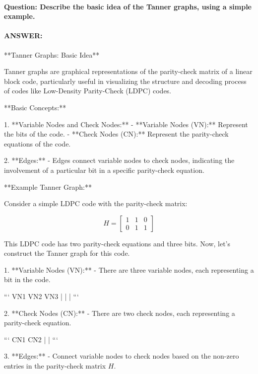 \documentclass[colorlinks,11pt,a4paper,normalphoto,withhyper,ragged2e]{altareport}
\begin{document}
				
				
				
				\paragraph{Question: Describe the basic idea of the Tanner graphs, using a simple example.}
				\paragraph{ANSWER:}
				
				**Tanner Graphs: Basic Idea**
				
				Tanner graphs are graphical representations of the parity-check matrix of a linear block code, particularly useful in visualizing the structure and decoding process of codes like Low-Density Parity-Check (LDPC) codes.
				
				**Basic Concepts:**
				
				1. **Variable Nodes and Check Nodes:**
				- **Variable Nodes (VN):** Represent the bits of the code.
				- **Check Nodes (CN):** Represent the parity-check equations of the code.
				
				2. **Edges:**
				- Edges connect variable nodes to check nodes, indicating the involvement of a particular bit in a specific parity-check equation.
				
				**Example Tanner Graph:**
				
				Consider a simple LDPC code with the parity-check matrix:
				
				\[ H = \begin{bmatrix} 1 & 1 & 0 \\ 0 & 1 & 1 \end{bmatrix} \]
				
				This LDPC code has two parity-check equations and three bits. Now, let's construct the Tanner graph for this code.
				
				1. **Variable Nodes (VN):**
				- There are three variable nodes, each representing a bit in the code.
				
				```
				VN1  VN2  VN3
				|    |    |
				```
				
				2. **Check Nodes (CN):**
				- There are two check nodes, each representing a parity-check equation.
				
				```
				CN1  CN2
				|    |
				```
				
				3. **Edges:**
				- Connect variable nodes to check nodes based on the non-zero entries in the parity-check matrix \( H \).
				
\end{document}
